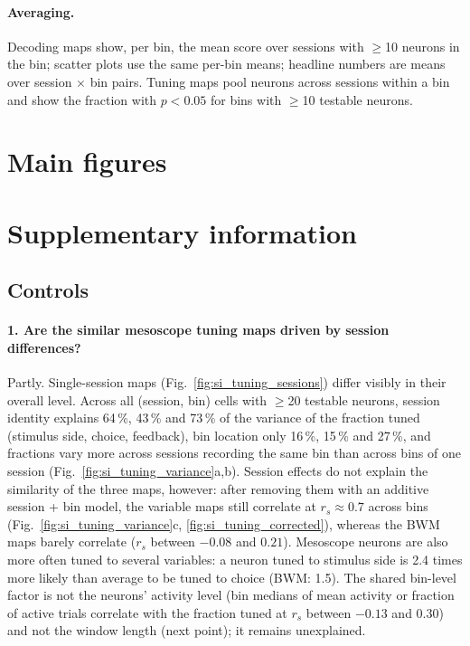 \documentclass[10pt]{article}
\begin{document}
\paragraph{Averaging.}
Decoding maps show, per bin, the mean score over sessions with $\geq$10 neurons in the bin; scatter plots use the same per-bin means; headline numbers are means over session $\times$ bin pairs. Tuning maps pool neurons across sessions within a bin and show the fraction with $p<0.05$ for bins with $\geq$10 testable neurons.

\section*{Main figures}







\clearpage

\section*{Supplementary information}
\label{sec:controls}
\setcounter{figure}{0}
\renewcommand{\thefigure}{S\arabic{figure}}

\subsection*{Controls}
\paragraph{1. Are the similar mesoscope tuning maps driven by session differences?}
Partly. Single-session maps (Fig.~\ref{fig:si_tuning_sessions}) differ visibly in their overall level. Across all (session, bin) cells with $\geq$20 testable neurons, session identity explains 64\,\%, 43\,\% and 73\,\% of the variance of the fraction tuned (stimulus side, choice, feedback), bin location only 16\,\%, 15\,\% and 27\,\%, and fractions vary more across sessions recording the same bin than across bins of one session (Fig.~\ref{fig:si_tuning_variance}a,b). Session effects do not explain the similarity of the three maps, however: after removing them with an additive session + bin model, the variable maps still correlate at $r_s \approx 0.7$ across bins (Fig.~\ref{fig:si_tuning_variance}c, \ref{fig:si_tuning_corrected}), whereas the BWM maps barely correlate ($r_s$ between $-0.08$ and $0.21$). Mesoscope neurons are also more often tuned to several variables: a neuron tuned to stimulus side is 2.4 times more likely than average to be tuned to choice (BWM: 1.5). The shared bin-level factor is not the neurons' activity level (bin medians of mean activity or fraction of active trials correlate with the fraction tuned at $r_s$ between $-0.13$ and $0.30$) and not the window length (next point); it remains unexplained.
\end{document}
